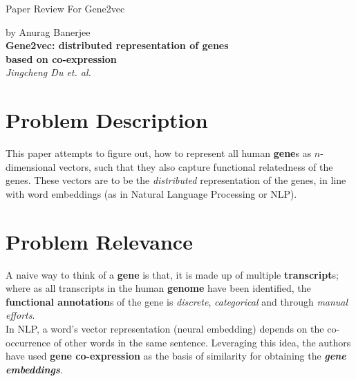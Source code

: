 \documentclass{article}
\begin{document}
\begin{sloppypar}

    \begin{center}
    
        \Large{Paper Review For Gene2vec} \\
        \author{}{by Anurag Banerjee}\\
        
        \vspace{1em}
        \LARGE{\textbf{Gene2vec: distributed representation of genes \\ based on co-expression}\cite{gene2vec}} \\
    	\Large{\textit{Jingcheng Du et. al.}} \\
     
    \end{center}
	
    \begin{normalsize}
    
    	
		
		
		\section{Problem Description}
        This paper attempts to figure out, how to represent all human \textbf{gene}s as $n$-dimensional
		vectors, such that they also capture functional relatedness of the genes.
		These vectors are to be the \textit{distributed} representation of the genes,
		in line with word embeddings (as in Natural Language Processing or NLP).
                
        \section{Problem Relevance}
        A naive way to think of a \textbf{gene} is that, it is made up of multiple \textbf{transcript}s; where as all transcripts in the human \textbf{genome} have been identified, the \textbf{functional annotation}s of the gene is \textit{discrete}, \textit{categorical} and through \textit{manual efforts}.\\

		In NLP, a word's vector representation (neural embedding) depends on the co-occurrence of other words in the same sentence. Leveraging this idea, the authors have used \textbf{gene co-expression} as the basis of similarity for obtaining the \textit{\textbf{gene embeddings}}.\\


\end{normalsize}
\end{sloppypar}
\end{document}
